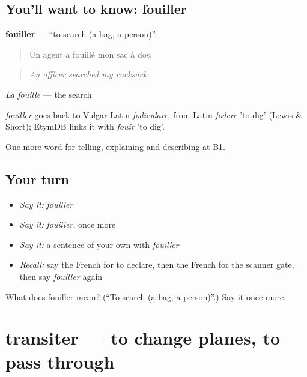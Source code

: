 \subsection*{You'll want to know: fouiller}
\textbf{fouiller} — \textquotedblleft{}to search (a bag, a person)\textquotedblright{}.

\begin{quote}
Un agent a fouillé mon sac à dos.
\end{quote}

\begin{quote}
\emph{An officer searched my rucksack.}
\end{quote}

\emph{La fouille} — the search.

\begin{cousinweb}
\emph{fouiller} goes back to Vulgar Latin \emph{fodiculāre}, from Latin \emph{fodere} 'to dig' (Lewis \& Short); EtymDB links it with \emph{fouir} 'to dig'.
\end{cousinweb}

\begin{grammarlens}[title={What you've built}]
One more word for telling, explaining and describing at B1.
\end{grammarlens}

\subsection*{Your turn}
\begin{itemize}
\raggedright
  \item \emph{Say it:} \emph{fouiller}
  \item \emph{Say it:} \emph{fouiller}, once more
  \item \emph{Say it:} a sentence of your own with \emph{fouiller}
  \item \emph{Recall:} say the French for to declare, then the French for the scanner gate, then say \emph{fouiller} again
\end{itemize}

\begin{tcolorbox}[breakable,colback=teal!4,colframe=teal!35!black,title={Before you move on}]
What does fouiller mean? (\textquotedblleft{}To search (a bag, a person)\textquotedblright{}.) Say it once more.
\end{tcolorbox}
\section[transiter]{transiter — to change planes, to pass through}

